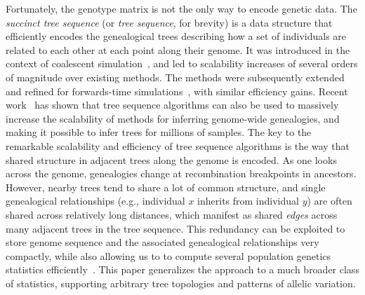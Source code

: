\documentclass{article}
\begin{document}
Fortunately, the genotype matrix is not the only way to encode genetic data.
The \emph{succinct tree sequence} (or \emph{tree sequence}, for brevity) is a data
structure that efficiently encodes the genealogical trees describing how a set of
individuals are related to each other at each point along their genome.
It was introduced in the context of coalescent
simulation~\citep{kelleher2016efficient}, and led to scalability increases of
several orders of magnitude over existing methods. The methods were subsequently extended
and refined for forwards-time
simulations~\citep{kelleher2018efficient,haller2018tree}, with similar efficiency gains.
Recent work~\citep{kelleher2019inferring} has shown that tree sequence algorithms can
also be used to massively increase the scalability of methods for inferring
genome-wide genealogies, and making it possible to infer trees for millions of
samples.
The key to the remarkable scalability and efficiency of tree sequence
algorithms is the way that shared structure in adjacent trees along the genome is encoded.
As one looks across the genome, genealogies change at recombination breakpoints in ancestors.
However, nearby trees tend to share a lot of common structure,
and single genealogical relationships (e.g., individual $x$ inherits from individual $y$)
are often shared across relatively long distances,
which manifest as shared \emph{edges} across many adjacent trees in the tree sequence.
This redundancy can be exploited to store genome sequence and the
associated genealogical relationships very compactly, while also
allowing us to to compute several population genetics statistics
efficiently~\citep{kelleher2016efficient}.
This paper generalizes the approach to a much broader class of statistics,
supporting arbitrary tree topologies and patterns of allelic variation.
\end{document}
